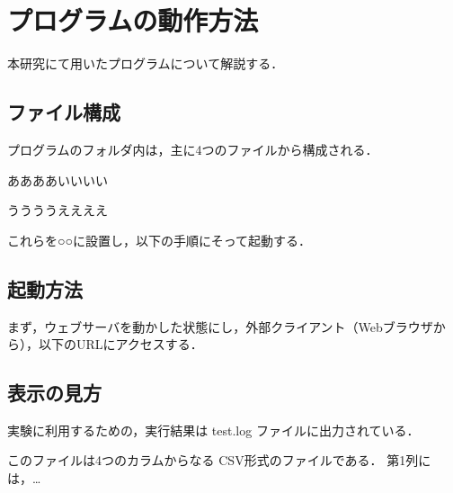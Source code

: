 \documentclass[a4paper,11pt,oneside,openany]{jsbook}
\begin{document}
\chapter{プログラムの動作方法}
本研究にて用いたプログラムについて解説する．

\section{ファイル構成}
プログラムのフォルダ内は，主に4つのファイルから構成される．

ああああいいいい

ううううええええ

これらを○○に設置し，以下の手順にそって起動する．

\section{起動方法}
まず，ウェブサーバを動かした状態にし，外部クライアント（Webブラウザから），以下のURLにアクセスする．


\section{表示の見方}
実験に利用するための，実行結果は test.log ファイルに出力されている．

このファイルは4つのカラムからなる CSV形式のファイルである．
第1列には，…

%
\end{document}
